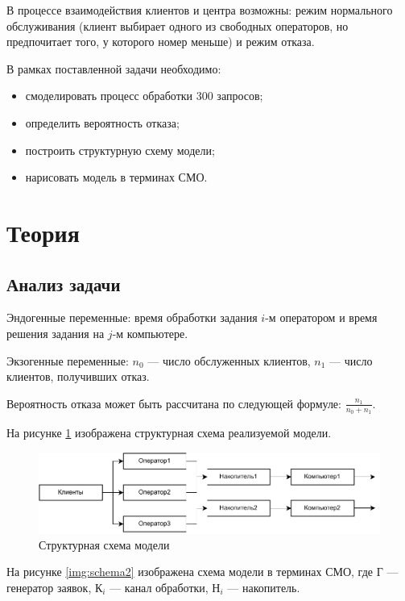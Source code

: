 \documentclass[12pt]{report}
\begin{document}
В процессе взаимодействия клиентов и центра возможны: режим нормального обслуживания (клиент выбирает одного из свободных операторов, но предпочитает того, у которого номер меньше) и режим отказа.


В рамках поставленной задачи необходимо:
\begin{itemize}
    \item смоделировать процесс обработки 300 запросов;
    \item определить вероятность отказа;
    \item построить структурную схему модели;
    \item нарисовать модель в терминах СМО.
\end{itemize}

\section*{Теория}

\subsection*{Анализ задачи}
Эндогенные переменные: время обработки задания $i$-м оператором и время решения задания на $j$-м компьютере.

Экзогенные переменные: $n_0$ --- число обслуженных клиентов, $n_1$ --- число клиентов, получивших отказ.

Вероятность отказа может быть рассчитана по следующей формуле:
$\frac{n_1}{n_0 + n_1}$.

На рисунке \ref{img:schema1} изображена структурная схема реализуемой модели.

\begin{figure}[h!btp]
	\centering
	\includegraphics[width=1\columnwidth]{inc/schema1.pdf}
	\caption{Структурная схема модели}
	\label{img:schema1}	
\end{figure}


На рисунке \ref{img:schema2} изображена схема модели в терминах СМО, где $\text{Г}$ --- генератор заявок, $\text{К}_i$ --- канал обработки, $\text{Н}_i$ --- накопитель.
\end{document}
